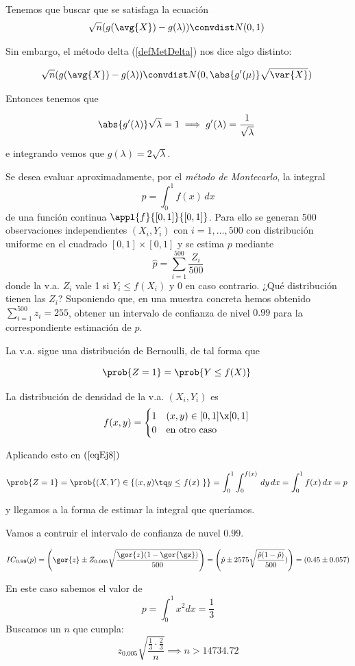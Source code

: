 \begin{problem}[7]
\spart Tenemos que buscar que se satisfaga la ecuación \[ \sqrt{n}(g(\avg{X}) - g(\lambda))\convdist N(0,1) \]

Sin embargo, el método delta (\ref{defMetDelta}) nos dice algo distinto:

\[ \sqrt{n}(g(\avg{X}) - g(\lambda))\convdist N(0,\abs{g'(\mu)}\sqrt{\var{X}}) \]

Entonces tenemos que 

\[ \abs{g'(\lambda)}\sqrt{\lambda} = 1 \implies g'(\lambda) = \frac{1}{\sqrt{\lambda}} \]

e integrando vemos que $g(\lambda) = 2\sqrt{\lambda} $.
\end{problem}

\begin{problem}[8]
\ppart Se desea evaluar aproximadamente, por el \textit{método de Montecarlo}, la integral 
\[ p = \int_0^1f(x)\,dx \] 
de una función continua $\appl{f}{[0,1]}{[0,1]}$. Para ello se generan 500 observaciones independientes $(X_i,Y_i)$ con $i=1,\dotsc,500$ con distribución uniforme en el cuadrado $[0,1]×[0,1]$ y se estima $p$ mediante
\[ \hat{p} = \sum_{i=1}^{500} \frac{Z_i}{500} \]
donde la v.a. $Z_i$ vale 1 si $Y_i \leq f(X_i)$ y $0$ en caso contrario. ¿Qué distribución tienen las $Z_i$? Suponiendo que, en una muestra concreta hemos obtenido $\sum_{i=1}^{500} z_i = 255$, obtener un intervalo de confianza de nivel $0.99$ para la correspondiente estimación de $p$.

\solution
\spart La v.a. sigue una distribución de Bernoulli, de tal forma que

\begin{equation} \prob{Z=1}=\prob{Y \leq f(X)} \label{eqEj8} \end{equation}

\pagebreak
La distribución de densidad de la v.a. $(X_i, Y_i)$ es 
\[
f(x,y) = \begin{cases}
1 & (x,y) \in [0,1] \x [0,1] \\
0 & \text{en otro caso}
\end{cases}
\]

Aplicando esto en $(\ref{eqEj8})$

\[ \prob{Z=1} = \prob{(X,Y) \in \{(x,y)\tq y \leq f(x) \}} = \int_0^1\int_0^{f(x)} \,dy\,dx = \int_0^1f(x)\,dx = p \]

y llegamos a la forma de estimar la integral que queríamos. 

Vamos a contruir el intervalo de confianza de nuvel $0.99$.

\[IC_{0.99} (p) = \left(\gor{z} \pm Z_{0.005}\sqrt{\frac{\gor{z}(1-\gor{\gz})}{500}}\right) = \left(\hat{p} \pm 2575 \sqrt{\frac{\hat{p}(1-\hat{p})}{500}}) \right) = (0.45\pm 0.057)\]


\spart En este caso sabemos el valor de \[ p = \int_0^1 x^2dx = \frac{1}{3} \]
Buscamos un $n$ que cumpla: \[ z_{0.005} \sqrt{\frac{\frac{1}{3}\cdot\frac{2}{3}}{n}} \implies n > 14734.72 \]

\end{problem}


